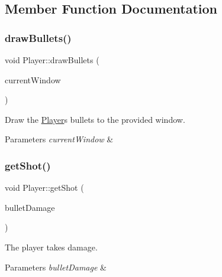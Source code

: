 \subsection{Member Function Documentation}
\mbox{\label{class_player_aa75798d0eaf3066acc57f6cb3158f0bb}} 
\subsubsection{\texorpdfstring{draw\+Bullets()}{drawBullets()}}
{\footnotesize\ttfamily void Player\+::draw\+Bullets (\begin{DoxyParamCaption}\item[{sf\+::\+Render\+Window $\ast$}]{current\+Window }\end{DoxyParamCaption})}



Draw the \hyperlink{class_player}{Player}\textquotesingle{}s bullets to the provided window. 


\begin{DoxyParams}{Parameters}
{\em current\+Window} & \\
\hline
\end{DoxyParams}
\mbox{\label{class_player_a13e6164daf86c00800992d756339fe51}} 
\subsubsection{\texorpdfstring{get\+Shot()}{getShot()}}
{\footnotesize\ttfamily void Player\+::get\+Shot (\begin{DoxyParamCaption}\item[{int}]{bullet\+Damage }\end{DoxyParamCaption})}



The player takes damage. 


\begin{DoxyParams}{Parameters}
{\em bullet\+Damage} & \\
\hline
\end{DoxyParams}
\mbox{\label{class_player_a4a72b5ba696e55375ee614ef89a87ade}} 
